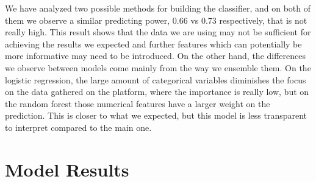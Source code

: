 We have analyzed two possible methods for building the classifier, and on both of them we observe a similar predicting power, 0.66 vs 0.73 respectively, that is not really high. This result shows that the data we are using may not be sufficient for achieving the results we expected and further  features which can potentially be more informative may need to be introduced. On the other hand, the differences we observe between models come mainly from the way we ensemble them. On the logistic regression, the large amount of categorical variables diminishes the focus on the data gathered on the platform, where the importance is really low, but on the random forest those numerical features have a larger weight on the prediction. This is closer to what we expected, but this model is less transparent to interpret compared to the main one. 



\section{Model Results}\label{sec:tables}

